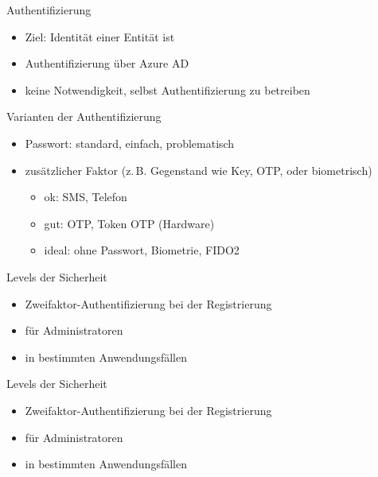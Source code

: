 
\begin{flashcard}[Definition]{Authentifizierung}
  \begin{itemize}
    \item Ziel: Identität einer Entität ist 
    \item Authentifizierung über Azure AD
    \item keine Notwendigkeit, selbst Authentifizierung zu betreiben
  \end{itemize}
\end{flashcard}

\begin{flashcard}[Definition]{Varianten der Authentifizierung}
  \begin{itemize}
    \item Passwort: standard, einfach, problematisch
    \item zusätzlicher Faktor (z.\,B. Gegenstand wie Key, OTP, oder biometrisch)
    \begin{itemize}
      \item ok: SMS, Telefon
      \item gut: OTP, Token OTP (Hardware)
      \item ideal: ohne Passwort, Biometrie, FIDO2
    \end{itemize}
  \end{itemize}
\end{flashcard}

\begin{flashcard}[Definition]{Levels der Sicherheit}
  \begin{itemize}
    \item Zweifaktor-Authentifizierung bei der Registrierung
    \item für Administratoren
    \item in bestimmten Anwendungsfällen
  \end{itemize}
\end{flashcard}

\begin{flashcard}[Definition]{Levels der Sicherheit}
  \begin{itemize}
    \item Zweifaktor-Authentifizierung bei der Registrierung
    \item für Administratoren
    \item in bestimmten Anwendungsfällen
  \end{itemize}
\end{flashcard}

